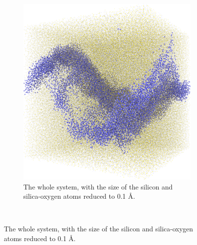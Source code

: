 \begin{figure}[!p]
{\begin{subfigure}[t]{\myfigwidth}
            \includegraphics[width=\textwidth]{images/systems/trimmed-rough_fracture04_07}%
            \caption{The whole system, with the size of the silicon and silica-oxygen atoms reduced to 0.1 \AA.}%
        \end{subfigure}%
    }%
    \vspace{10pt}\\%
\end{figure}
